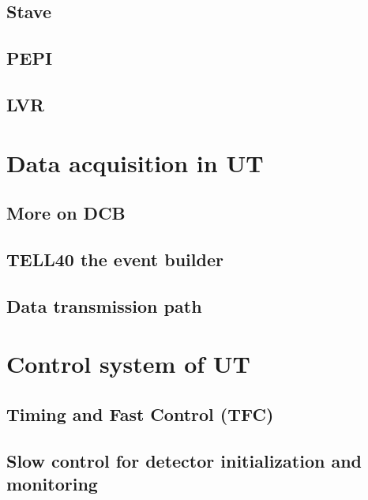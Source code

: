\subsection{Stave}


\subsection{PEPI}


\subsection{LVR}


\section{Data acquisition in UT}
\label{ref:ut:daq}

\subsection{More on DCB}


\subsection{TELL40 the event builder}


\subsection{Data transmission path}


\section{Control system of UT}
\label{ref:ut:ctrl}


\subsection{Timing and Fast Control (TFC)}


\subsection{Slow control for detector initialization and monitoring}
